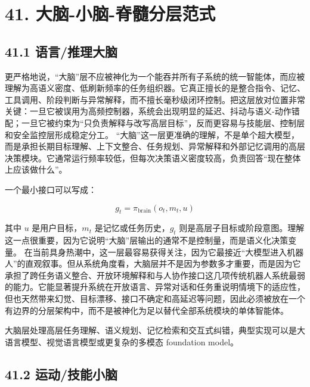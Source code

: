 \chapter*{41. 大脑-小脑-脊髓分层范式}

\section*{41.1 语言/推理大脑}


更严格地说，“大脑”层不应被神化为一个能吞并所有子系统的统一智能体，而应被理解为高语义密度、低刷新频率的任务组织器。它真正擅长的是整合指令、记忆、工具调用、阶段判断与异常解释，而不擅长毫秒级闭环控制。把这层放对位置非常关键：一旦它被误用为高频控制器，系统会出现明显的延迟、抖动与语义-动作错配；一旦它被约束为“只负责解释与改写高层目标”，反而更容易与技能层、控制层和安全监控层形成稳定分工。 “大脑”这一层更准确的理解，不是单个超大模型，而是承担长期目标理解、上下文整合、任务规划、异常解释和外部记忆调用的高层决策模块。它通常运行频率较低，但每次决策语义密度较高，负责回答“现在整体上应该做什么”。

一个最小接口可以写成：

\begin{equation*}
g_t = \pi_{\text{brain}}(o_t, m_t, u)
\end{equation*}

其中 \(u\) 是用户目标，\(m_t\) 是记忆或任务历史，\(g_t\) 则是高层子目标或阶段意图。理解这一点很重要，因为它说明“大脑”层输出的通常不是控制量，而是语义化决策变量。 在当前具身热潮中，这一层最容易获得关注，因为它最接近“大模型进入机器人”的直观叙事。但从系统角度看，大脑层并不是因为参数多才重要，而是因为它承担了跨任务语义整合、开放环境解释和与人协作接口这几项传统机器人系统最弱的能力。它能显著提升系统在开放语言、异常对话和任务重说明情境下的适应性，但也天然带来幻觉、目标漂移、接口不确定和高延迟等问题，因此必须被放在一个有边界的分层架构中，而不是被神化为足以替代全部系统模块的单体智能体。

大脑层处理高层任务理解、语义规划、记忆检索和交互式纠错，典型实现可以是大语言模型、视觉语言模型或更复杂的多模态 foundation model。

\section*{41.2 运动/技能小脑}


